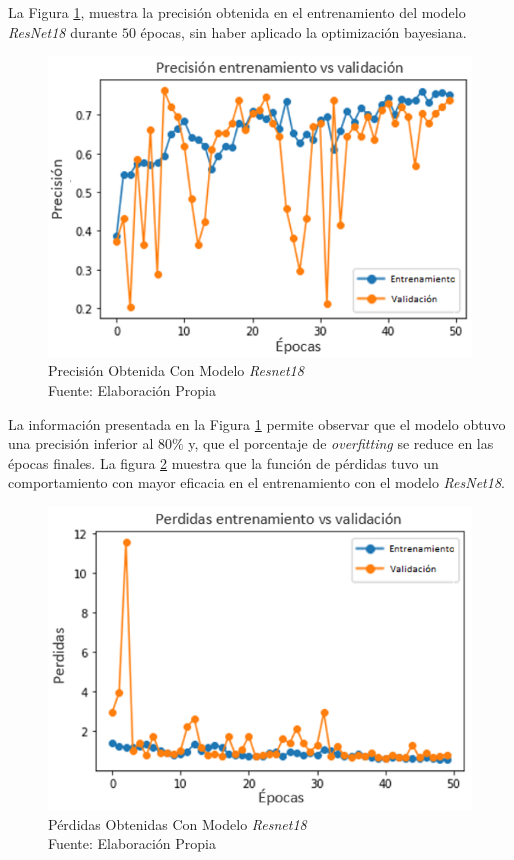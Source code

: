 La Figura \ref{fig:preci_RESNET18}, muestra la precisión obtenida en el entrenamiento del modelo \textit{ResNet18} durante $50$ épocas, sin haber aplicado la optimización bayesiana.

\vspace{0.5cm}

\begin{figure}[ht]
	\centering
	\includegraphics[scale=0.7]{Figs/109.png}
	\caption{Precisión Obtenida Con Modelo \textit{Resnet18} \\ Fuente: Elaboración Propia}
	\label{fig:preci_RESNET18}
\end{figure}


\vspace{0.5cm}

La información presentada en la Figura \ref{fig:preci_RESNET18} permite observar que el modelo obtuvo una precisión inferior al $80\%$ y, que el porcentaje de \textit{overfitting} se reduce en las épocas finales. La figura \ref{fig:perdda_RESNET18} muestra que la función de pérdidas tuvo un comportamiento con mayor eficacia en el entrenamiento con el modelo \textit{ResNet18}.

\newpage
\begin{figure}[ht]
	\centering
	\includegraphics[scale=0.7]{Figs/110.png}
	\caption{Pérdidas Obtenidas Con Modelo \textit{Resnet18}\\ Fuente: Elaboración Propia}
	\label{fig:perdda_RESNET18}
\end{figure}

